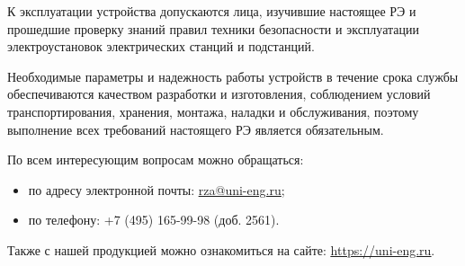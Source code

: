 \medskip

\par
К эксплуатации устройства допускаются лица, изучившие настоящее РЭ и прошедшие проверку знаний правил техники безопасности и эксплуатации электроустановок электрических станций и подстанций.

\medskip

\par
Необходимые параметры и надежность работы устройств в течение срока службы обеспечиваются качеством разработки и изготовления, соблюдением условий транспортирования, хранения, монтажа, наладки и обслуживания, поэтому выполнение всех требований настоящего РЭ является обязательным.

\medskip

\par
По всем интересующим вопросам можно обращаться:
\begin{itemize}
\item по адресу электронной почты: \href{mailto:rza@uni-eng.ru}{\color{unigreen}\uline{rza@uni-eng.ru}};
\item по телефону: +7 (495) 165-99-98 (доб. 2561).
\end{itemize}
Также с нашей продукцией можно ознакомиться на сайте: \href{https://uni-eng.ru}{\color{unigreen}\uline{https://uni-eng.ru}}.

